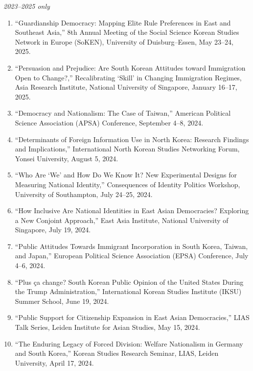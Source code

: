 \documentclass[11pt, a4paper]{article}
\begin{document}
{\small\textit{2023--2025 only}}

\begin{enumerate}[itemsep=0.15em]
  \item ``Guardianship Democracy: Mapping Elite Rule Preferences in East and Southeast Asia,'' 8th Annual Meeting of the Social Science Korean Studies Network in Europe (SoKEN), University of Duisburg--Essen, May 23--24, 2025.

  \item ``Persuasion and Prejudice: Are South Korean Attitudes toward Immigration Open to Change?,'' Recalibrating `Skill' in Changing Immigration Regimes, Asia Research Institute, National University of Singapore, January 16--17, 2025.

  \item ``Democracy and Nationalism: The Case of Taiwan,'' American Political Science Association (APSA) Conference, September 4--8, 2024.

  \item ``Determinants of Foreign Information Use in North Korea: Research Findings and Implications,'' International North Korean Studies Networking Forum, Yonsei University, August 5, 2024.

  \item ``Who Are `We' and How Do We Know It? New Experimental Designs for Measuring National Identity,'' Consequences of Identity Politics Workshop, University of Southampton, July 24--25, 2024.

  \item ``How Inclusive Are National Identities in East Asian Democracies? Exploring a New Conjoint Approach,'' East Asia Institute, National University of Singapore, July 19, 2024.

  \item ``Public Attitudes Towards Immigrant Incorporation in South Korea, Taiwan, and Japan,'' European Political Science Association (EPSA) Conference, July 4--6, 2024.

  \item ``Plus \c{c}a change? South Korean Public Opinion of the United States During the Trump Administration,'' International Korean Studies Institute (IKSU) Summer School, June 19, 2024.

  \item ``Public Support for Citizenship Expansion in East Asian Democracies,'' LIAS Talk Series, Leiden Institute for Asian Studies, May 15, 2024.

  \item ``The Enduring Legacy of Forced Division: Welfare Nationalism in Germany and South Korea,'' Korean Studies Research Seminar, LIAS, Leiden University, April 17, 2024.


\end{enumerate}
\end{document}

